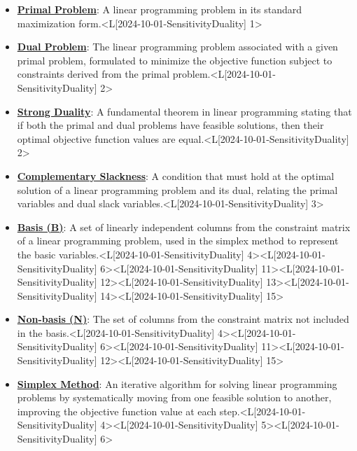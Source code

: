 \documentclass{article}%
\begin{document}
\begin{itemize}[[leftmargin=*]]%
\item \href{https://www.math.purdue.edu/~yipn/421/2024-10-01-SensitivityDuality.pdf#page=1}{\textbf{Primal Problem}}: A linear programming problem in its standard maximization form.<L[2024-10-01-SensitivityDuality] 1>%
\item \href{https://www.math.purdue.edu/~yipn/421/2024-10-01-SensitivityDuality.pdf#page=2}{\textbf{Dual Problem}}: The linear programming problem associated with a given primal problem, formulated to minimize the objective function subject to constraints derived from the primal problem.<L[2024-10-01-SensitivityDuality] 2>%
\item \href{https://www.math.purdue.edu/~yipn/421/2024-10-01-SensitivityDuality.pdf#page=2}{\textbf{Strong Duality}}: A fundamental theorem in linear programming stating that if both the primal and dual problems have feasible solutions, then their optimal objective function values are equal.<L[2024-10-01-SensitivityDuality] 2>%
\item \href{https://www.math.purdue.edu/~yipn/421/2024-10-01-SensitivityDuality.pdf#page=3}{\textbf{Complementary Slackness}}: A condition that must hold at the optimal solution of a linear programming problem and its dual, relating the primal variables and dual slack variables.<L[2024-10-01-SensitivityDuality] 3>%
\item \href{https://www.math.purdue.edu/~yipn/421/2024-10-01-SensitivityDuality.pdf#page=4}{\textbf{Basis (B)}}: A set of linearly independent columns from the constraint matrix of a linear programming problem, used in the simplex method to represent the basic variables.<L[2024-10-01-SensitivityDuality] 4><L[2024-10-01-SensitivityDuality] 6><L[2024-10-01-SensitivityDuality] 11><L[2024-10-01-SensitivityDuality] 12><L[2024-10-01-SensitivityDuality] 13><L[2024-10-01-SensitivityDuality] 14><L[2024-10-01-SensitivityDuality] 15>%
\item \href{https://www.math.purdue.edu/~yipn/421/2024-10-01-SensitivityDuality.pdf#page=4}{\textbf{Non{-}basis (N)}}: The set of columns from the constraint matrix not included in the basis.<L[2024-10-01-SensitivityDuality] 4><L[2024-10-01-SensitivityDuality] 6><L[2024-10-01-SensitivityDuality] 11><L[2024-10-01-SensitivityDuality] 12><L[2024-10-01-SensitivityDuality] 15>%
\item \href{https://www.math.purdue.edu/~yipn/421/2024-10-01-SensitivityDuality.pdf#page=4}{\textbf{Simplex Method}}: An iterative algorithm for solving linear programming problems by systematically moving from one feasible solution to another, improving the objective function value at each step.<L[2024-10-01-SensitivityDuality] 4><L[2024-10-01-SensitivityDuality] 5><L[2024-10-01-SensitivityDuality] 6>%

\end{itemize}
\end{document}
